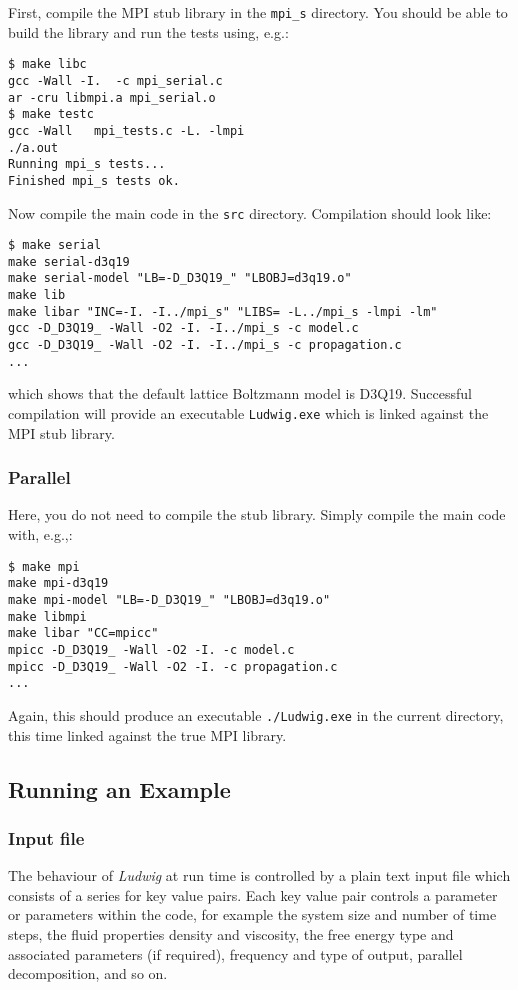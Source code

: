 First, compile the MPI stub library in the \texttt{mpi\_s}
directory. You should be able to build the library and run the
tests using, e.g.:

\begin{lstlisting}
$ make libc
gcc -Wall -I.  -c mpi_serial.c
ar -cru libmpi.a mpi_serial.o
$ make testc
gcc -Wall   mpi_tests.c -L. -lmpi
./a.out
Running mpi_s tests...
Finished mpi_s tests ok.
\end{lstlisting}

Now compile the main code in the \texttt{src} directory.
Compilation should look like:

\begin{lstlisting}
$ make serial
make serial-d3q19
make serial-model "LB=-D_D3Q19_" "LBOBJ=d3q19.o"
make lib
make libar "INC=-I. -I../mpi_s" "LIBS= -L../mpi_s -lmpi -lm"
gcc -D_D3Q19_ -Wall -O2 -I. -I../mpi_s -c model.c
gcc -D_D3Q19_ -Wall -O2 -I. -I../mpi_s -c propagation.c
...
\end{lstlisting}
which shows that the default lattice Boltzmann model is D3Q19.
Successful compilation will provide an executable \texttt{Ludwig.exe}
which is linked against the MPI stub library.

\subsubsection{Parallel}

Here, you do not need to compile the stub library. Simply compile
the main code with, e.g.,:
\begin{lstlisting}
$ make mpi
make mpi-d3q19
make mpi-model "LB=-D_D3Q19_" "LBOBJ=d3q19.o"
make libmpi
make libar "CC=mpicc"
mpicc -D_D3Q19_ -Wall -O2 -I. -c model.c
mpicc -D_D3Q19_ -Wall -O2 -I. -c propagation.c
...
\end{lstlisting}

Again, this should produce an executable \texttt{./Ludwig.exe}
in the current directory, this time linked against the true MPI
library.

\subsection{Running an Example}

\subsubsection{Input file}

The behaviour of \textit{Ludwig} at run time is controlled by
a plain text input file which consists of a series for key value
pairs. Each key value pair controls a parameter or parameters
within the code, for example the system size and number of time steps,
the fluid properties density and viscosity, the free energy type
and associated parameters (if required), frequency and type of
output, parallel decomposition, and so on.


